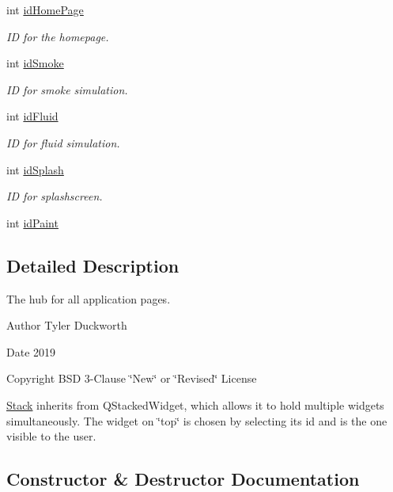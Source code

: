 \begin{DoxyCompactItemize}
int \mbox{\hyperlink{classStack_a11bccc127cb975dc118f08df920fd48d}{id\+Home\+Page}}
\begin{DoxyCompactList}\small\item\em ID for the homepage. \end{DoxyCompactList}\item 
int \mbox{\hyperlink{classStack_ad4c5c03c0dde0b63650bd258183a6ed3}{id\+Smoke}}
\begin{DoxyCompactList}\small\item\em ID for smoke simulation. \end{DoxyCompactList}\item 
int \mbox{\hyperlink{classStack_a91b33262d86feccc9a358076b69a0e90}{id\+Fluid}}
\begin{DoxyCompactList}\small\item\em ID for fluid simulation. \end{DoxyCompactList}\item 
int \mbox{\hyperlink{classStack_a448b69ac9652860c3f94f4cf2972052f}{id\+Splash}}
\begin{DoxyCompactList}\small\item\em ID for splashscreen. \end{DoxyCompactList}\item 
int \mbox{\hyperlink{classStack_af1ad238355f4a635bda88ca8b664dd29}{id\+Paint}}
\end{DoxyCompactItemize}


\subsection{Detailed Description}
The hub for all application pages. 

\begin{DoxyAuthor}{Author}
Tyler Duckworth 
\end{DoxyAuthor}
\begin{DoxyDate}{Date}
2019 
\end{DoxyDate}
\begin{DoxyCopyright}{Copyright}
B\+SD 3-\/Clause \char`\"{}\+New\char`\"{} or \char`\"{}\+Revised\char`\"{} License
\end{DoxyCopyright}
\mbox{\hyperlink{classStack}{Stack}} inherits from Q\+Stacked\+Widget, which allows it to hold multiple widgets simultaneously. The widget on \char`\"{}top\char`\"{} is chosen by selecting its id and is the one visible to the user. 

\subsection{Constructor \& Destructor Documentation}
\mbox{\label{classStack_aa9d4cb23f0d4ade8db1df8624629cc14}} 

